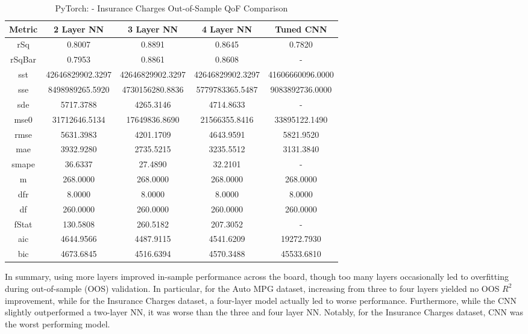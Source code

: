 \documentclass{article}
\begin{document}
\begin{table}[H]
\centering
\caption{PyTorch: - Insurance Charges Out-of-Sample QoF Comparison}
\label{tab:PyTorch: - Insurance Charges Out-of-Sample QoF Comparison}
\begin{tabular}{|c|c|c|c|c|} \hline
Metric & 2 Layer NN & 3 Layer NN & 4 Layer NN & Tuned CNN \\ \hline \hline
rSq & 0.8007 & 0.8891 & 0.8645 & 0.7820 \\ \hline
rSqBar & 0.7953 & 0.8861 & 0.8608 & - \\ \hline
sst & 42646829902.3297 & 42646829902.3297 & 42646829902.3297 & 41606660096.0000 \\ \hline
sse & 8498989265.5920 & 4730156280.8836 & 5779783365.5487 & 9083892736.0000 \\ \hline
sde & 5717.3788 & 4265.3146 & 4714.8633 & - \\ \hline
mse0 & 31712646.5134 & 17649836.8690 & 21566355.8416 & 33895122.1490 \\ \hline
rmse & 5631.3983 & 4201.1709 & 4643.9591 & 5821.9520 \\ \hline
mae & 3932.9280 & 2735.5215 & 3235.5512 & 3131.3840 \\ \hline
smape & 36.6337 & 27.4890 & 32.2101 & - \\ \hline
m & 268.0000 & 268.0000 & 268.0000 & 268.0000 \\ \hline
dfr & 8.0000 & 8.0000 & 8.0000 & 8.0000 \\ \hline
df & 260.0000 & 260.0000 & 260.0000 & 260.0000 \\ \hline
fStat & 130.5808 & 260.5182 & 207.3052 & - \\ \hline
aic & 4644.9566 & 4487.9115 & 4541.6209 & 19272.7930 \\ \hline
bic & 4673.6845 & 4516.6394 & 4570.3488 & 45533.6810 \\ \hline
\end{tabular}
\end{table}

In summary, using more layers improved in-sample performance across the board, though too many layers occasionally led to overfitting during out-of-sample (OOS) validation. In particular, for the Auto MPG dataset, increasing from three to four layers yielded no OOS $R^{2}$ improvement, while for the Insurance Charges dataset, a four-layer model actually led to worse performance. Furthermore, while the CNN slightly outperformed a two-layer NN, it was worse than the three and four layer NN. Notably, for the Insurance Charges dataset, CNN was the worst performing model.
\end{document}
